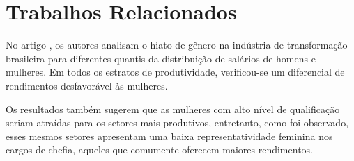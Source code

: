 \section{Trabalhos Relacionados}

No artigo \cite{ceballos2021airline}, os autores analisam o hiato de gênero na indústria de transformação brasileira para diferentes quantis da distribuição de salários de homens e mulheres. Em todos os estratos de produtividade, verificou-se um diferencial de rendimentos desfavorável às mulheres.

Os resultados também sugerem que as mulheres com alto nível de
qualificação seriam atraídas para os setores mais produtivos, entretanto, como foi observado, esses mesmos setores apresentam uma baixa representatividade feminina nos cargos de chefia, aqueles que comumente oferecem maiores rendimentos.
